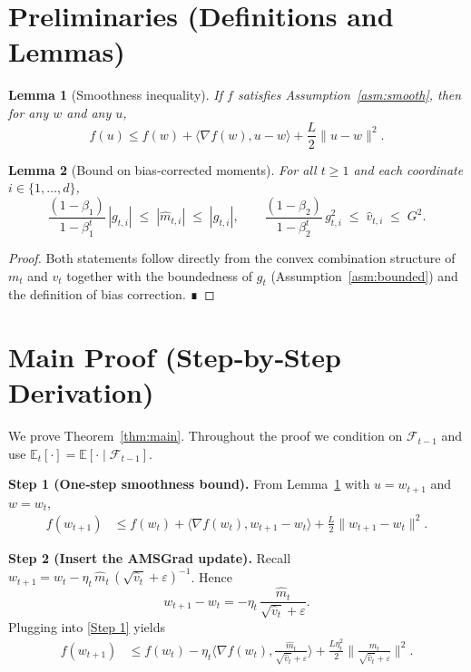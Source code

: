 \documentclass{article}
\newtheorem{lemma}{Lemma}
\newcommand{\EE}{\mathbb{E}}
\begin{document}
\section*{Preliminaries (Definitions and Lemmas)}
\begin{lemma}[Smoothness inequality]\label{lem:smooth}
If $f$ satisfies Assumption~\ref{asm:smooth}, then for any $w$ and any $u$,
\[
f(u)\le f(w)+\langle\nabla f(w),u-w\rangle+\frac{L}{2}\|u-w\|^{2}.
\]
\end{lemma}
\begin{lemma}[Bound on bias‑corrected moments]\label{lem:momentbound}
For all $t\ge1$ and each coordinate $i\in\{1,\dots,d\}$,
\[
\frac{(1-\beta_{1})}{1-\beta_{1}^{t}}\,|g_{t,i}|\;\le\;| \hat m_{t,i}|\;\le\;|g_{t,i}|,
\qquad
\frac{(1-\beta_{2})}{1-\beta_{2}^{t}}\,g_{t,i}^{2}\;\le\;\hat v_{t,i}\;\le\;G^{2}.
\]
\end{lemma}
\begin{proof}
Both statements follow directly from the convex combination structure of $m_{t}$ and $v_{t}$ together with the boundedness of $g_{t}$ (Assumption~\ref{asm:bounded}) and the definition of bias correction. ∎
\end{proof}

\section*{Main Proof (Step‑by‑Step Derivation)}
We prove Theorem~\ref{thm:main}.  Throughout the proof we condition on $\mathcal{F}_{t-1}$ and use $\EE_{t}[\cdot]=\EE[\cdot\mid\mathcal{F}_{t-1}]$.

\noindent\textbf{Step 1 (One‑step smoothness bound).}  
From Lemma~\ref{lem:smooth} with $u=w_{t+1}$ and $w=w_{t}$,
\begin{align}
f(w_{t+1}) &\le f(w_{t}) + \langle\nabla f(w_{t}),w_{t+1}-w_{t}\rangle
               +\frac{L}{2}\|w_{t+1}-w_{t}\|^{2}. \tag{Step 1}
\end{align}

\noindent\textbf{Step 2 (Insert the AMSGrad update).}  
Recall $w_{t+1}=w_{t}-\eta_{t}\, \hat m_{t}\,(\sqrt{\hat v_{t}}+\varepsilon)^{-1}$.  Hence
\[
w_{t+1}-w_{t}= -\eta_{t}\,\frac{\hat m_{t}}{\sqrt{\hat v_{t}}+\varepsilon}.
\]
Plugging into \eqref{Step 1} yields
\begin{align}
f(w_{t+1}) &\le f(w_{t})
           -\eta_{t}\Big\langle\nabla f(w_{t}),\frac{\hat m_{t}}{\sqrt{\hat v_{t}}+\varepsilon}\Big\rangle
           +\frac{L\eta_{t}^{2}}{2}\Big\|\frac{\hat m_{t}}{\sqrt{\hat v_{t}}+\varepsilon}\Big\|^{2}. \tag{Step 2}
\end{align}
\end{document}
